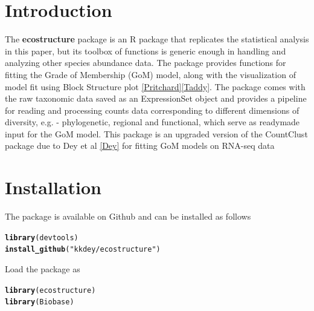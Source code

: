 \documentclass[12pt]{article}\usepackage[]{graphicx}\usepackage[usenames,dvipsnames]{color}
\makeatletter
\newcommand{\hlstr}[1]{\textcolor[rgb]{0.192,0.494,0.8}{#1}}%
\newcommand{\hlstd}[1]{\textcolor[rgb]{0.345,0.345,0.345}{#1}}%
\newcommand{\hlkwd}[1]{\textcolor[rgb]{0.737,0.353,0.396}{\textbf{#1}}}%
\newenvironment{kframe}{%
 \def\at@end@of@kframe{}%
 \ifinner\ifhmode%
  \def\at@end@of@kframe{\end{minipage}}%
  \begin{minipage}{\columnwidth}%
 \fi\fi%
 \def\FrameCommand##1{\hskip\@totalleftmargin \hskip-\fboxsep
 \colorbox{shadecolor}{##1}\hskip-\fboxsep
     \hskip-\linewidth \hskip-\@totalleftmargin \hskip\columnwidth}%
 \MakeFramed {\advance\hsize-\width
   \@totalleftmargin\z@ \linewidth\hsize
   \@setminipage}}%
 {\par\unskip\endMakeFramed%
 \at@end@of@kframe}
\newenvironment{knitrout}{}{} %
\makeatother
\begin{document}
\maketitle

\section{Introduction}

The \textbf{ecostructure} package is an R package that replicates the statistical analysis in this paper, but its toolbox of functions is generic enough in handling and analyzing other species abundance data. The package provides functions for fitting the Grade of Membership (GoM) model, along with the visualization of model fit using Block Structure plot \ref{Pritchard}\ref{Taddy}. The package comes with the raw taxonomic data saved as an ExpressionSet object and provides a pipeline for reading and processing counts data corresponding to different dimensions of diversity, e.g. - phylogenetic, regional and functional, which serve as readymade input for the GoM model. This package is an upgraded version of the CountClust package due to Dey et al \ref{Dey} for fitting GoM models on RNA-seq data

\section{Installation}

The package is available on Github and can be installed as follows



\begin{knitrout}
\color{fgcolor}\begin{kframe}
\begin{alltt}
\hlkwd{library}\hlstd{(devtools)}
\hlkwd{install_github}\hlstd{(}\hlstr{"kkdey/ecostructure"}\hlstd{)}
\end{alltt}
\end{kframe}
\end{knitrout}

Load the package as

\begin{knitrout}
\color{fgcolor}\begin{kframe}
\begin{alltt}
\hlkwd{library}\hlstd{(ecostructure)}
\hlkwd{library}\hlstd{(Biobase)}
\end{alltt}
\end{kframe}
\end{knitrout}
\end{document}
